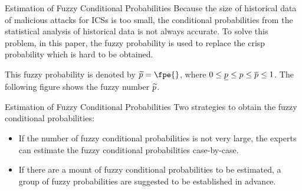 \begin{frame}{Estimation of Fuzzy Conditional Probabilities}
    Because the size of historical data of malicious attacks for ICSs is too small, the conditional probabilities from the statistical analysis of historical data is not always accurate. To solve this problem, in this paper, the fuzzy probability is used to replace the crisp probability which is hard to be obtained.

    \pause
    This fuzzy probability is denoted by $\fp{p} = \fpe{}$, where $0 \leq \underline{p}{} \leq p \leq \overline{p}{} \leq 1$. The following figure shows the fuzzy number $\widetilde{p}{}$.
    \begin{figure}
      \centering
      
    \end{figure}
    \vspace{-20pt}
\end{frame}

\begin{frame}{Estimation of Fuzzy Conditional Probabilities}
    Two strategies to obtain the fuzzy conditional probabilities:\pause
    \begin{itemize}
      \item If the number of fuzzy conditional probabilities is not very large, the experts can estimate the fuzzy conditional probabilities case-by-case.\pause
      \item If there are a mount of fuzzy conditional probabilities to be estimated, a group of fuzzy probabilities are suggested to be established in advance.
    \end{itemize}
    \vspace{5pt}\pause
    
    \vspace{-10pt}
\end{frame} 